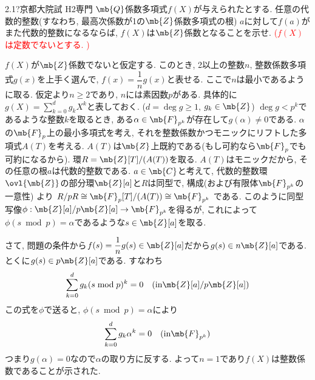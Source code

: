 \begin{prob}{2.1}{\hosi ?}{京都大院試 H2専門}
$\mb{Q}$係数多項式$f(X)$が与えられたとする. 任意の代数的整数(すなわち, 最高次係数が1の$\mb{Z}$係数多項式の根) $a$に対して$f(a)$がまた代数的整数になるならば, $f(X)$は$\mb{Z}$係数となることを示せ. \textcolor{red}{($f(X)$は定数でないとする. )}
\end{prob}
$f(X)$が$\mb{Z}$係数でないと仮定する. このとき, 2以上の整数$n$, 整数係数多項式$g(x)$を上手く選んで, $f(x) = \dfrac{1}{n} g(x)$と表せる. ここで$n$は最小であるように取る. 仮定より$n\geq 2$であり, $n$には素因数$p$がある. 具体的に$g(X) = \sum_{k=0}^{d} g_k X^{k}$と表しておく. ($d = \deg{g} \geq 1$, $g_k \in \mb{Z}$)
 $\deg{g} < p^{k}$であるような整数$k$を取るとき, ある$\alpha\in \mb{F}_{p^{k}}$が存在して$g(\alpha)\neq 0$である. $\alpha$の$\mb{F}_{p}$上の最小多項式を考え, それを整数係数かつモニックにリフトした多項式$A(T)$を考える. $A(T)$は$\mb{Z}$上既約である(もし可約なら$\mb{F}_{p}$でも可約になるから). 環$R=\mb{Z}[T]/(A(T))$を取る. $A(T)$はモニックだから, その任意の根$a$は代数的整数である.  $a\in \mb{C}$と考えて, 代数的整数環$\ovl{\mb{Z}}$の部分環$\mb{Z}[a]$と$R$は同型で,  構成(および有限体$\mb{F}_{p^{k}}$の一意性) より $R/pR \cong \mb{F}_{p}[T]/(A(T)) \cong \mb{F}_{p^{k}}$ である. このように同型写像$\phi:\mb{Z}[a]/p\mb{Z}[a] \to \mb{F}_{p^{k}}$を得るが, これによって$\phi(s\bmod{p}) = \alpha$であるような$s\in \mb{Z}[a]$を取る.   \par
さて, 問題の条件から$f(s) = \dfrac{1}{n} g(s) \in \mb{Z}[a]$だから$g(s)\in n\mb{Z}[a]$である. とくに$g(s) \in p\mb{Z}[a]$である. すなわち
\[
\sum_{k=0}^{d} g_k (s\bmod{p})^{k} = 0 \quad (\text{in}  \mb{Z}[a]/p\mb{Z}[a])
\]
この式を$\phi$で送ると, $\phi(s\bmod{p}) = \alpha$により
\[
\sum_{k=0}^{d} g_k \alpha^{k} = 0 \quad (\text{in} \mb{F}_{p^{k}})
\]
つまり$g(\alpha) = 0$なので$\alpha$の取り方に反する. よって$n=1$であり$f(X)$は整数係数であることが示された.
